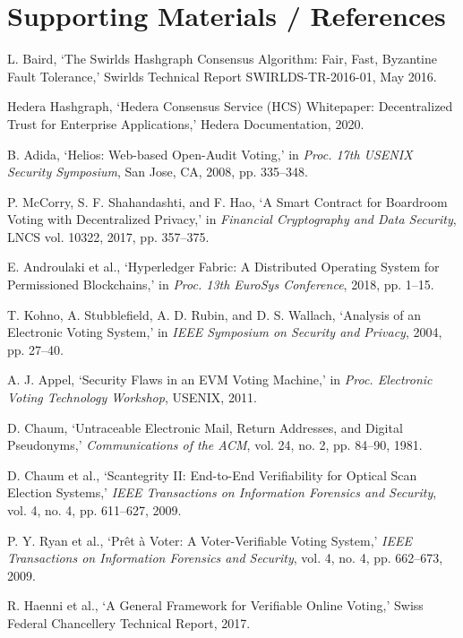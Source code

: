 \documentclass[12pt, a4paper]{article}
\begin{document}
\newpage
\section{Supporting Materials / References}
\begin{enumerate}[label={[\arabic*]}, leftmargin=*]
    \item L. Baird, `The Swirlds Hashgraph Consensus Algorithm: Fair, Fast, Byzantine Fault Tolerance,' Swirlds Technical Report SWIRLDS-TR-2016-01, May 2016.
    \item Hedera Hashgraph, `Hedera Consensus Service (HCS) Whitepaper: Decentralized Trust for Enterprise Applications,' Hedera Documentation, 2020.
    \item B. Adida, `Helios: Web-based Open-Audit Voting,' in \textit{Proc. 17th USENIX Security Symposium}, San Jose, CA, 2008, pp. 335--348.
    \item P. McCorry, S. F. Shahandashti, and F. Hao, `A Smart Contract for Boardroom Voting with Decentralized Privacy,' in \textit{Financial Cryptography and Data Security}, LNCS vol. 10322, 2017, pp. 357--375.
    \item E. Androulaki et al., `Hyperledger Fabric: A Distributed Operating System for Permissioned Blockchains,' in \textit{Proc. 13th EuroSys Conference}, 2018, pp. 1--15.
    \item T. Kohno, A. Stubblefield, A. D. Rubin, and D. S. Wallach, `Analysis of an Electronic Voting System,' in \textit{IEEE Symposium on Security and Privacy}, 2004, pp. 27--40.
    \item A. J. Appel, `Security Flaws in an EVM Voting Machine,' in \textit{Proc. Electronic Voting Technology Workshop}, USENIX, 2011.
    \item D. Chaum, `Untraceable Electronic Mail, Return Addresses, and Digital Pseudonyms,' \textit{Communications of the ACM}, vol. 24, no. 2, pp. 84--90, 1981.
    \item D. Chaum et al., `Scantegrity II: End-to-End Verifiability for Optical Scan Election Systems,' \textit{IEEE Transactions on Information Forensics and Security}, vol. 4, no. 4, pp. 611--627, 2009.
    \item P. Y. Ryan et al., `Prêt à Voter: A Voter-Verifiable Voting System,' \textit{IEEE Transactions on Information Forensics and Security}, vol. 4, no. 4, pp. 662--673, 2009.
    \item R. Haenni et al., `A General Framework for Verifiable Online Voting,' Swiss Federal Chancellery Technical Report, 2017.

\end{enumerate}
\end{document}

